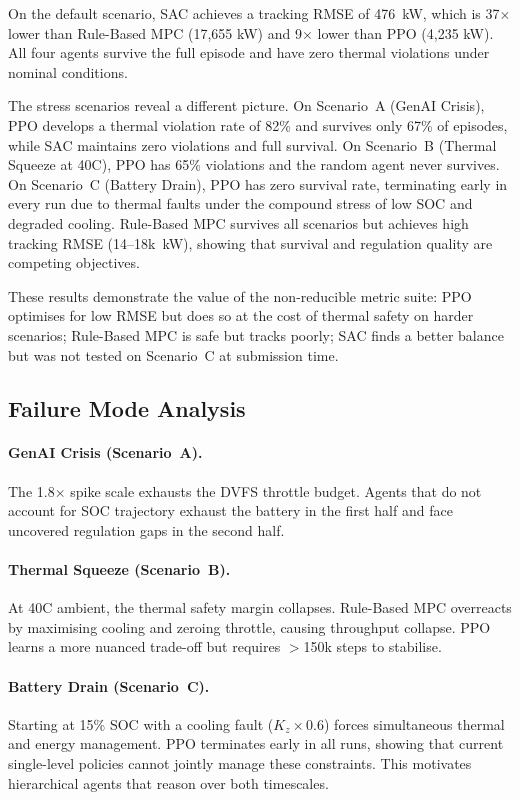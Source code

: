 \documentclass{article}
\begin{document}
On the default scenario, SAC achieves a tracking RMSE of 476~kW, which is
37$\times$ lower than Rule-Based MPC (17,655 kW) and 9$\times$ lower than
PPO (4,235 kW).
All four agents survive the full episode and have zero thermal violations
under nominal conditions.

The stress scenarios reveal a different picture.
On Scenario~A (GenAI Crisis), PPO develops a thermal violation rate of 82\%
and survives only 67\% of episodes, while SAC maintains zero violations and
full survival.
On Scenario~B (Thermal Squeeze at 40\textdegree C), PPO has 65\% violations
and the random agent never survives.
On Scenario~C (Battery Drain), PPO has zero survival rate, terminating
early in every run due to thermal faults under the compound stress of low
SOC and degraded cooling.
Rule-Based MPC survives all scenarios but achieves high tracking RMSE
(14--18k~kW), showing that survival and regulation quality are competing
objectives.

These results demonstrate the value of the non-reducible metric suite:
PPO optimises for low RMSE but does so at the cost of thermal safety on
harder scenarios; Rule-Based MPC is safe but tracks poorly; SAC finds
a better balance but was not tested on Scenario~C at submission time.

\subsection{Failure Mode Analysis}
\label{sec:failures}

\paragraph{GenAI Crisis (Scenario~A).}
The 1.8$\times$ spike scale exhausts the DVFS throttle budget.
Agents that do not account for SOC trajectory exhaust the battery in the
first half and face uncovered regulation gaps in the second half.

\paragraph{Thermal Squeeze (Scenario~B).}
At 40\textdegree C ambient, the thermal safety margin collapses.
Rule-Based MPC overreacts by maximising cooling and zeroing throttle,
causing throughput collapse.
PPO learns a more nuanced trade-off but requires $>$150k steps to stabilise.

\paragraph{Battery Drain (Scenario~C).}
Starting at 15\% SOC with a cooling fault ($K_z \times 0.6$) forces
simultaneous thermal and energy management.
PPO terminates early in all runs, showing that current single-level
policies cannot jointly manage these constraints.
This motivates hierarchical agents that reason over both timescales.
\end{document}
